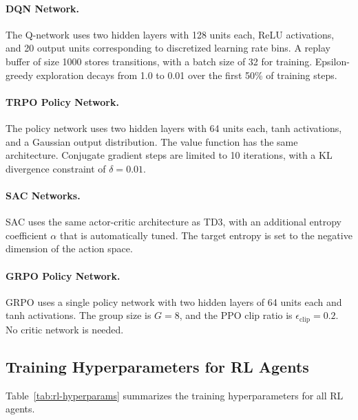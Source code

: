 \documentclass[11pt]{article}
\begin{document}
\paragraph{DQN Network.} The Q-network uses two hidden layers with 128 units each, ReLU activations, and 20 output units corresponding to discretized learning rate bins. A replay buffer of size 1000 stores transitions, with a batch size of 32 for training. Epsilon-greedy exploration decays from 1.0 to 0.01 over the first 50\% of training steps.

\paragraph{TRPO Policy Network.} The policy network uses two hidden layers with 64 units each, tanh activations, and a Gaussian output distribution. The value function has the same architecture. Conjugate gradient steps are limited to 10 iterations, with a KL divergence constraint of $\delta = 0.01$.

\paragraph{SAC Networks.} SAC uses the same actor-critic architecture as TD3, with an additional entropy coefficient $\alpha$ that is automatically tuned. The target entropy is set to the negative dimension of the action space.

\paragraph{GRPO Policy Network.} GRPO uses a single policy network with two hidden layers of 64 units each and tanh activations. The group size is $G=8$, and the PPO clip ratio is $\epsilon_{\text{clip}} = 0.2$. No critic network is needed.

\subsection{Training Hyperparameters for RL Agents}

Table~\ref{tab:rl-hyperparams} summarizes the training hyperparameters for all RL agents.
\end{document}
